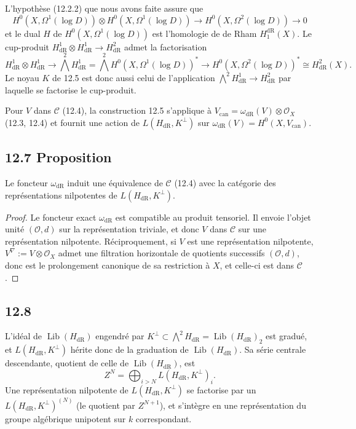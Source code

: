 \documentclass[12pt,a4paper]{article}
\theoremstyle{plain}
\theoremstyle{definition}
\theoremstyle{remark}
\DeclareMathOperator{\Lib}{Lib}
\newcommand{\cC}{\mathcal{C}}
\newcommand{\cO}{\mathcal{O}}
\newcommand{\dr}{\mathrm{dR}}
\begin{document}
L'hypothèse (12.2.2) que nous avons faite assure que
\begin{equation}\label{eq:12.6.1}
H^0(X, \Omega^1(\log D)) \otimes H^0(X, \Omega^1(\log D)) \to H^0(X, \Omega^2(\log D)) \to 0
\end{equation}
et le dual $H$ de $H^0(X, \Omega^1(\log D))$ est l'homologie de de Rham $H_1^{\dr}(X)$. Le cup-produit $H^1_{\dr} \otimes H^1_{\dr} \to H^2_{\dr}$ admet la factorisation
\[
H^1_{\dr} \otimes H^1_{\dr} \to \textstyle\bigwedge^2 H^1_{\dr} = \bigwedge^2 H^0(X, \Omega^1(\log D))^* \to H^0(X, \Omega^2(\log D))^* \cong H^2_{\dr}(X).
\]
Le noyau $K$ de 12.5 est donc aussi celui de l'application $\bigwedge^2 H^1_{\dr} \to H^2_{\dr}$ par laquelle se factorise le cup-produit.

Pour $V$ dans $\cC$ (12.4), la construction 12.5 s'applique à $V_{\text{can}} = \omega_{\dr}(V) \otimes \cO_X$ (12.3, 12.4) et fournit une action de $L(H_{\dr}, K^\perp)$ sur $\omega_{\dr}(V) = H^0(X, V_{\text{can}})$.

\subsection*{12.7 Proposition}

Le foncteur $\omega_{\dr}$ induit une équivalence de $\cC$ (12.4) avec la catégorie des représentations nilpotentes de $L(H_{\dr}, K^\perp)$.

\begin{proof}
Le foncteur exact $\omega_{\dr}$ est compatible au produit tensoriel. Il envoie l'objet unité $(\cO, d)$ sur la représentation triviale, et donc $V$ dans $\cC$ sur une représentation nilpotente. Réciproquement, si $V$ est une représentation nilpotente, $V^\nabla := V \otimes \cO_X$ admet une filtration horizontale de quotients successifs $(\cO, d)$, donc est le prolongement canonique de sa restriction à $X$, et celle-ci est dans $\cC$.
\end{proof}

\subsection*{12.8}

L'idéal de $\Lib(H_{\dr})$ engendré par $K^\perp \subset \bigwedge^2 H_{\dr} = \Lib(H_{\dr})_2$ est gradué, et $L(H_{\dr}, K^\perp)$ hérite donc de la graduation de $\Lib(H_{\dr})$. Sa série centrale descendante, quotient de celle de $\Lib(H_{\dr})$, est
\[
Z^N = \bigoplus_{i > N} L(H_{\dr}, K^\perp)_i.
\]
Une représentation nilpotente de $L(H_{\dr}, K^\perp)$ se factorise par un $L(H_{\dr}, K^\perp)^{(N)}$ (le quotient par $Z^{N+1}$), et s'intègre en une représentation du groupe algébrique unipotent sur $k$ correspondant.
\end{document}
